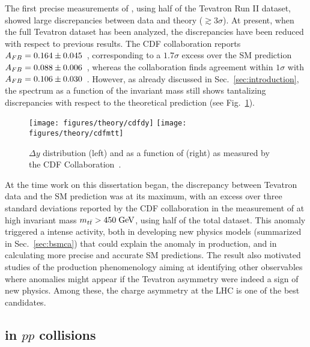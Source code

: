 The first precise measurements of \afb, using half
of the Tevatron Run II dataset, showed large discrepancies between
data and theory ($\gtrsim 3\sigma$).
At present, when the full Tevatron dataset has been analyzed, the
discrepancies have been reduced with respect to previous results. The
CDF collaboration reports \mbox{$A_{FB}=0.164\pm0.045$}~\cite{Aaltonen:2012it},
corresponding to a $1.7\sigma$ excess over the SM prediction \mbox{$A_{FB}{} =
0.088\pm{}0.006$}~\cite{Bernreuther:2012sx}, whereas the \dzero{} collaboration
finds agreement within $1\sigma$ with
\mbox{$A_{FB}{}=0.106\pm0.030$}~\cite{Abazov:2014cca}. However, as
already discussed in Sec.~\ref{sec:introduction}, the \afb{} spectrum as a
function of the \ttbar{} invariant mass \mtt{} still shows tantalizing discrepancies with
respect to the theoretical prediction (see Fig.~\ref{fig:cdfafb}).

\begin{figure}[!htb]\centering
  \texttt{[image: figures/theory/cdfdy]}
  \texttt{[image: figures/theory/cdfmtt]}
  \caption{$\Delta{}y$ distribution (left)
    and \afb{} as a function of \mtt{} (right) as measured by the CDF
    Collaboration~\cite{Aaltonen:2012it}.} 
  \label{fig:cdfafb}
\end{figure}

At the time work on this dissertation began, the discrepancy between
Tevatron data and the SM prediction was at its maximum,
with an excess over three standard deviations reported by the CDF
collaboration in the measurement of \afb{} at high \ttbar{} invariant
mass $m_{t\bar{t}}{}>450\; \mathrm{GeV}{}$, using half of the total dataset. This anomaly
triggered a intense activity, both in developing new physics models
(summarized in Sec.~\ref{sec:bsmca})
that could explain the anomaly in \ttbar{} production, and in
calculating more precise and accurate SM predictions. The result also
motivated studies of the \ttbar{} production phenomenology aiming at
identifying other observables where anomalies might appear if the
Tevatron asymmetry were indeed a sign of new physics. Among these, the
charge asymmetry at the LHC is one of the best candidates. 

\subsection{\ac{} in $pp$ collisions}

